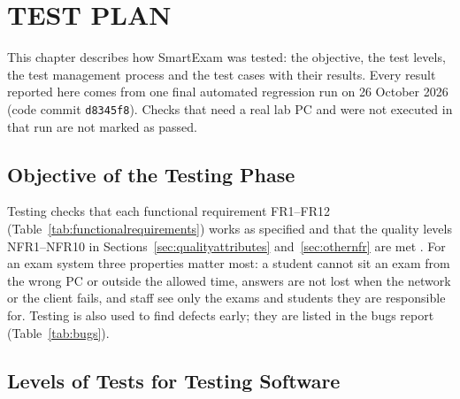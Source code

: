 \chapter{TEST PLAN}
\label{chap:testing}

This chapter describes how SmartExam was tested: the objective, the test levels, the test management process and the test cases with their results. Every result reported here comes from one final automated regression run on 26 October 2026 (code commit \texttt{d8345f8}). Checks that need a real lab PC and were not executed in that run are not marked as passed.

\section{Objective of the Testing Phase}
\label{sec:test_objective}

Testing checks that each functional requirement FR1--FR12 (Table~\ref{tab:functionalrequirements}) works as specified and that the quality levels NFR1--NFR10 in Sections~\ref{sec:qualityattributes} and~\ref{sec:othernfr} are met \cite{iso25010, sommerville}. For an exam system three properties matter most: a student cannot sit an exam from the wrong PC or outside the allowed time, answers are not lost when the network or the client fails, and staff see only the exams and students they are responsible for. Testing is also used to find defects early; they are listed in the bugs report (Table~\ref{tab:bugs}).

\section{Levels of Tests for Testing Software}
\label{sec:test_levels}

